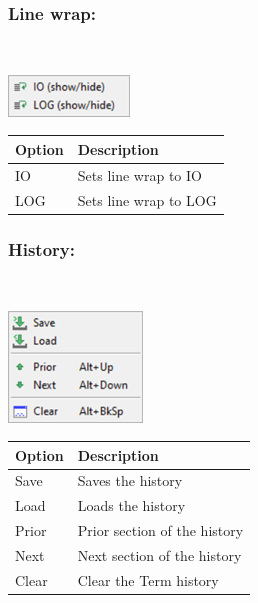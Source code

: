 \hypertarget{menu_r_term_linewrap}{}
\subsubsection{Line wrap:}\\

\includegraphics[scale=0.8]{./res/menu_r_term_linewrap.png}\\

\begin{scriptsize}
  \begin{tabularx}{\textwidth}{>{\hsize=0.3\hsize}X>{\hsize=0.7\hsize}X}\\
    \hline
    \textbf{Option} & \textbf{Description} \\
    \hline
    IO & Sets line wrap to IO \\
    LOG & Sets line wrap to LOG \\
    \hline
  \end{tabularx}
\end{scriptsize}

\subsubsection{History:}\\

\includegraphics[scale=0.8]{./res/menu_r_term_history.png}\\

\begin{scriptsize}
  \begin{tabularx}{\textwidth}{>{\hsize=0.3\hsize}X>{\hsize=0.7\hsize}X}\\
    \hline
    \textbf{Option} & \textbf{Description} \\
    \hline
    Save & Saves the history \\
    Load & Loads the history \\
    \hdashline[1pt/1pt]
    Prior & Prior section of the history \\
    Next & Next section of the history \\
    \hdashline[1pt/1pt]
    Clear & Clear the Term history \\
    \hline
  \end{tabularx}
\end{scriptsize}

